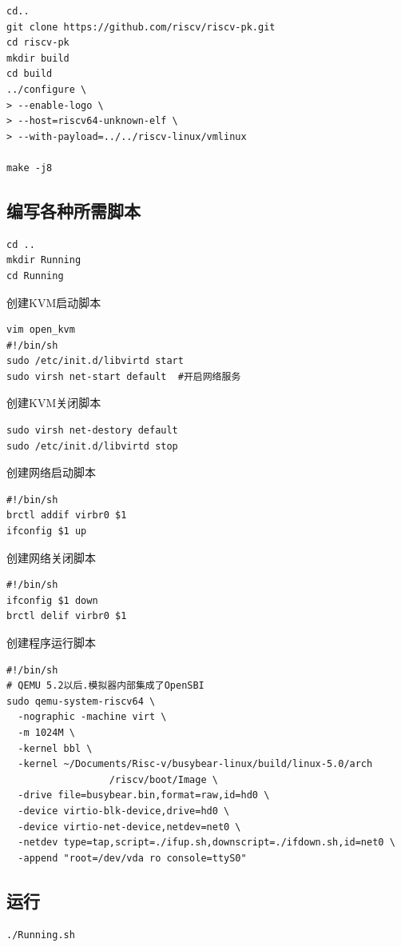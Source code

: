 \begin{lstlisting}
cd..
git clone https://github.com/riscv/riscv-pk.git
cd riscv-pk
mkdir build
cd build
../configure \
> --enable-logo \
> --host=riscv64-unknown-elf \
> --with-payload=../../riscv-linux/vmlinux

make -j8
\end{lstlisting}

\subsection{编写各种所需脚本}
\begin{lstlisting}
cd ..
mkdir Running
cd Running
\end{lstlisting}
创建KVM启动脚本
\begin{lstlisting}
vim open_kvm
#!/bin/sh
sudo /etc/init.d/libvirtd start
sudo virsh net-start default  #开启网络服务
\end{lstlisting}

创建KVM关闭脚本
\begin{lstlisting}
sudo virsh net-destory default
sudo /etc/init.d/libvirtd stop
\end{lstlisting}


创建网络启动脚本
\begin{lstlisting}
#!/bin/sh
brctl addif virbr0 $1
ifconfig $1 up
\end{lstlisting}

创建网络关闭脚本
\begin{lstlisting}
#!/bin/sh
ifconfig $1 down
brctl delif virbr0 $1
\end{lstlisting}

创建程序运行脚本
\begin{lstlisting}
#!/bin/sh
# QEMU 5.2以后.模拟器内部集成了OpenSBI
sudo qemu-system-riscv64 \
  -nographic -machine virt \
  -m 1024M \
  -kernel bbl \
  -kernel ~/Documents/Risc-v/busybear-linux/build/linux-5.0/arch
                  /riscv/boot/Image \
  -drive file=busybear.bin,format=raw,id=hd0 \
  -device virtio-blk-device,drive=hd0 \
  -device virtio-net-device,netdev=net0 \
  -netdev type=tap,script=./ifup.sh,downscript=./ifdown.sh,id=net0 \
  -append "root=/dev/vda ro console=ttyS0" 
\end{lstlisting}

\subsection{运行}
\begin{lstlisting}
./Running.sh
\end{lstlisting}

